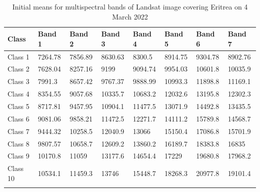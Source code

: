 \documentclass[sn-mathphys-num]{sn-jnl}%
\theoremstyle{thmstyleone}%
\theoremstyle{thmstyletwo}%
\theoremstyle{thmstylethree}%
\begin{document}
\vspace{-3pt}
\begin{table}[h]
\caption{Initial means for multispectral bands of Landsat image covering Eritrea on 4 March 2022}
\begin{tabular}{@{}llllllll@{}}
\toprule 
\textbf{Class} & \textbf{Band 1} & \textbf{Band 2} & \textbf{Band 3} & \textbf{Band 4} & \textbf{Band 5} & \textbf{Band 6} & \textbf{Band 7} \\  \midrule
    Class 1 & 7264.78 & 7856.89 & 8630.63 & 8300.5 & 8914.75 & 9304.78 & 8902.76 \\
    Class 2 & 7628.04 & 8257.16 & 9199 & 9094.74 & 9954.03 & 10601.8 & 10035.9 \\
    Class 3 & 7991.3 & 8657.42 & 9767.37 & 9888.99 & 10993.3 & 11898.8 & 11169.1 \\
    Class 4 & 8354.55 & 9057.68 & 10335.7 & 10683.2 & 12032.6 & 13195.8 & 12302.3 \\
    Class 5 & 8717.81 & 9457.95 & 10904.1 & 11477.5 & 13071.9 & 14492.8 & 13435.5 \\
    Class 6 & 9081.06 & 9858.21 & 11472.5 & 12271.7 & 14111.2 & 15789.8 & 14568.7 \\
    Class 7 & 9444.32 & 10258.5 & 12040.9 & 13066 & 15150.4 & 17086.8 & 15701.9 \\
    Class 8 & 9807.57 & 10658.7 & 12609.2 & 13860.2 & 16189.7 & 18383.8 & 16835 \\
    Class 9 & 10170.8 & 11059 & 13177.6 & 14654.4 & 17229 & 19680.8 & 17968.2 \\
    Class 10 & 10534.1 & 11459.3 & 13746 & 15448.7 & 18268.3 & 20977.8 & 19101.4 \\
    \botrule
\end{tabular}
\label{tabA03}
\end{table}
\end{document}
